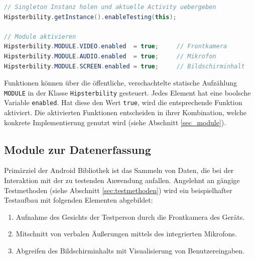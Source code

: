\begin{lstlisting}[label=list_hipsterbility_client_init,language=Java, caption=Beispiel für Initialisierung der Android-Bibliothek]
// Singleton Instanz holen und aktuelle Activity uebergeben
Hipsterbility.getInstance().enableTesting(this);

// Module aktivieren
Hipsterbility.MODULE.VIDEO.enabled 	= true; 	// Frontkamera
Hipsterbility.MODULE.AUDIO.enabled 	= true;		// Mikrofon
Hipsterbility.MODULE.SCREEN.enabled = true;		// Bildschirminhalt
\end{lstlisting}

Funktionen können über die öffentliche, verschachtelte statische Aufzählung \texttt{MODULE} in der Klasse \texttt{Hipsterbility} gesteuert.
Jedes Element hat eine boolsche Variable \texttt{enabled}.
Hat diese den Wert \texttt{true}, wird die entsprechende Funktion aktiviert.
Die aktivierten Funktionen entscheiden in ihrer Kombination, welche konkrete Implementierung genutzt wird (siehe Abschnitt \ref{sec_module}).

\pagebreak

\subsection{Module zur Datenerfassung \label{sec:module}}
Primärziel der Android Bibliothek ist das Sammeln von Daten, die bei der Interaktion mit der zu testenden Anwendung anfallen.
Angelehnt an gängige Testmethoden (siehe Abschnitt \ref{sec:testmethoden}) wird ein beispielhafter Testaufbau mit folgenden Elementen abgebildet:
\begin{enumerate}
	\item Aufnahme des Gesichts der Testperson durch die Frontkamera des Geräts.
	\item Mitschnitt von verbalen Äußerungen mittels des integrierten Mikrofons.
	\item Abgreifen des Bildschirminhalts mit Visualisierung von Benutzereingaben.
\end{enumerate}

